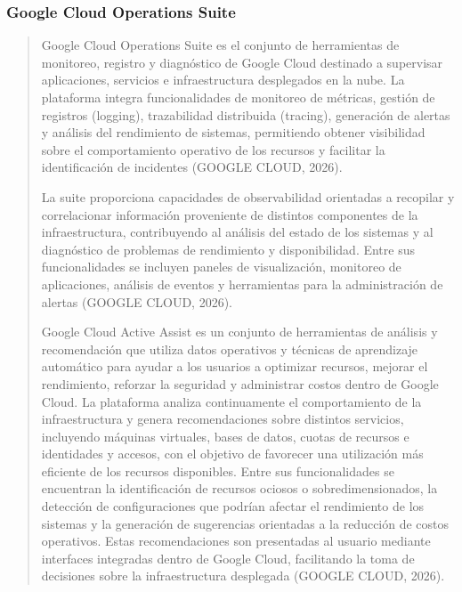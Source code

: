 \documentclass[
]{article}
\begin{document}
\subsubsection{Google Cloud Operations
Suite}\label{google-cloud-operations-suite}

\begin{quote}
Google Cloud Operations Suite es el conjunto de herramientas de
monitoreo, registro y diagnóstico de Google Cloud destinado a supervisar
aplicaciones, servicios e infraestructura desplegados en la nube. La
plataforma integra funcionalidades de monitoreo de métricas, gestión de
registros (logging), trazabilidad distribuida (tracing), generación de
alertas y análisis del rendimiento de sistemas, permitiendo obtener
visibilidad sobre el comportamiento operativo de los recursos y
facilitar la identificación de incidentes (GOOGLE CLOUD, 2026).

La suite proporciona capacidades de observabilidad orientadas a
recopilar y correlacionar información proveniente de distintos
componentes de la infraestructura, contribuyendo al análisis del estado
de los sistemas y al diagnóstico de problemas de rendimiento y
disponibilidad. Entre sus funcionalidades se incluyen paneles de
visualización, monitoreo de aplicaciones, análisis de eventos y
herramientas para la administración de alertas (GOOGLE CLOUD, 2026).

Google Cloud Active Assist es un conjunto de herramientas de análisis y
recomendación que utiliza datos operativos y técnicas de aprendizaje
automático para ayudar a los usuarios a optimizar recursos, mejorar el
rendimiento, reforzar la seguridad y administrar costos dentro de Google
Cloud. La plataforma analiza continuamente el comportamiento de la
infraestructura y genera recomendaciones sobre distintos servicios,
incluyendo máquinas virtuales, bases de datos, cuotas de recursos e
identidades y accesos, con el objetivo de favorecer una utilización más
eficiente de los recursos disponibles. Entre sus funcionalidades se
encuentran la identificación de recursos ociosos o sobredimensionados,
la detección de configuraciones que podrían afectar el rendimiento de
los sistemas y la generación de sugerencias orientadas a la reducción de
costos operativos. Estas recomendaciones son presentadas al usuario
mediante interfaces integradas dentro de Google Cloud, facilitando la
toma de decisiones sobre la infraestructura desplegada (GOOGLE CLOUD,
2026).


\end{quote}
\end{document}

